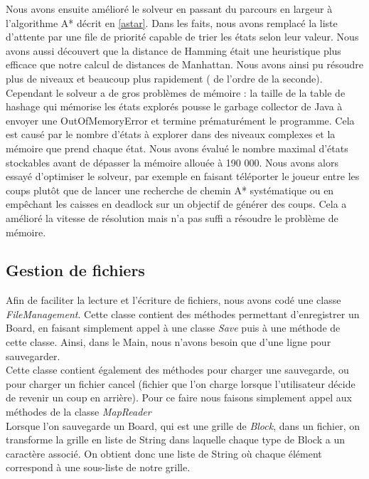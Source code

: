 \documentclass[a4paper,12pt]{article} %
\begin{document}
Nous avons ensuite amélioré le solveur en passant du parcours en largeur à l'algorithme A* décrit en \ref{astar}. Dans les faits, nous avons remplacé la liste d'attente par une file de priorité capable de trier les états selon leur valeur. Nous avons aussi découvert que la distance de Hamming était une heuristique plus efficace que notre calcul de distances de Manhattan. Nous avons ainsi pu résoudre plus de niveaux et beaucoup plus rapidement ( de l'ordre de la seconde).\\
Cependant le solveur a de gros problèmes de mémoire : la taille de la table de hashage qui mémorise les états explorés pousse le garbage collector de Java à envoyer une OutOfMemoryError et termine prématurément le programme. Cela est causé par le nombre d'états à explorer dans des niveaux complexes et la mémoire que prend chaque état. Nous avons évalué le nombre maximal d'états stockables avant de dépasser la mémoire allouée à 190 000.
Nous avons alors essayé d'optimiser le solveur, par exemple en faisant téléporter le joueur entre les coups plutôt que de lancer une recherche de chemin A* systématique ou en empêchant les caisses en deadlock sur un objectif de générer des coups. Cela a amélioré la vitesse de résolution mais n'a pas suffi a résoudre le problème de mémoire.

\subsection{Gestion de fichiers}

Afin de faciliter la lecture et l'écriture de fichiers, nous avons codé une classe \textit{FileManagement}. Cette classe contient des méthodes permettant d'enregistrer un Board, en faisant simplement appel à une classe \textit{Save} puis à une méthode de cette classe.
Ainsi, dans le Main, nous n'avons besoin que d'une ligne pour sauvegarder.
\\

Cette classe contient également des méthodes pour charger une sauvegarde, ou pour charger un fichier cancel (fichier que l'on charge lorsque l'utilisateur décide de revenir un coup en arrière). Pour ce faire nous faisons simplement appel aux méthodes de la classe \textit{MapReader}
\\

Lorsque l'on sauvegarde un Board, qui est une grille de \textit{Block}, dans un fichier, on transforme la grille en liste de String dans laquelle chaque type de Block a un caractère associé. On obtient donc une liste de String où chaque élément correspond à une sous-liste de notre grille.\\
\end{document}
